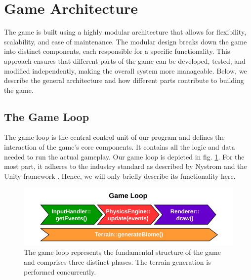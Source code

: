 \section{Game Architecture}


The game is built using a highly modular architecture that allows for flexibility, scalability, and ease of maintenance.
The modular design breaks down the game into distinct components, each responsible for a specific functionality.
This approach ensures that different parts of the game can be developed, tested, and modified independently, making the overall system more manageable.
Below, we describe the general architecture and how different parts contribute to building the game.

\subsection{The Game Loop}\label{sec:gameLoop}

The game loop is the central control unit of our program and defines the interaction of the game's core components.
It contains all the logic and data needed to run the actual gameplay.
Our game loop is depicted in fig. \ref{fig:gameLoop}.
For the most part, it adheres to the industry standard as described by Nystrom \cite{nystromGameLoop} and the Unity framework \cite{unityGameLoop}.
Hence, we will only briefly describe its functionality here.

\begin{figure}[h!]
    \centering
    \includegraphics[width=\linewidth]{figures/physics/gameLoop.pdf}
    \caption{The game loop represents the fundamental structure of the game and comprises three distinct phases. The terrain generation is performed concurrently.}
    \label{fig:gameLoop}
\end{figure}

